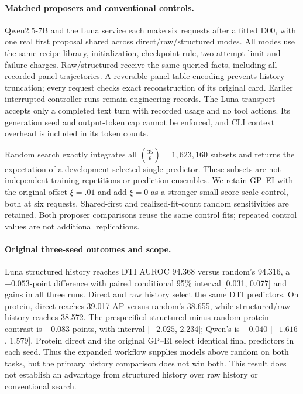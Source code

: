 \paragraph{Matched proposers and conventional controls.}
Qwen2.5-7B and the Luna service each make six requests after a fitted D00, with one real first proposal shared across direct/raw/structured modes. All modes use the same recipe library, initialization, checkpoint rule, two-attempt limit and failure charges. Raw/structured receive the same queried facts, including all recorded panel trajectories. A reversible panel-table encoding prevents history truncation; every request checks exact reconstruction of its original card. Earlier interrupted controller runs remain engineering records. The Luna transport accepts only a completed text turn with recorded usage and no tool actions. Its generation seed and output-token cap cannot be enforced, and CLI context overhead is included in its token counts.

Random search exactly integrates all $\binom{35}{6}=1{,}623{,}160$ subsets and returns the expectation of a development-selected single predictor. These subsets are not independent training repetitions or prediction ensembles. We retain GP--EI with the original offset $\xi=.01$ and add $\xi=0$ as a stronger small-score-scale control, both at six requests. Shared-first and realized-fit-count random sensitivities are retained. Both proposer comparisons reuse the same control fits; repeated control values are not additional replications.

\clearpage


\paragraph{Original three-seed outcomes and scope.}
Luna structured history reaches DTI AUROC 94.368 versus random's 94.316, a $+0.053$-point difference with paired conditional 95\% interval [0.031, 0.077] and gains in all three runs. Direct and raw history select the same DTI predictors. On protein, direct reaches 39.017 AP versus random's 38.655, while structured/raw history reaches 38.572. The prespecified structured-minus-random protein contrast is $-0.083$ points, with interval [$-2.025$, 2.234]; Qwen's is $-0.040$ [$-1.616$, 1.579]. Protein direct and the original GP--EI select identical final predictors in each seed. Thus the expanded workflow supplies models above random on both tasks, but the primary history comparison does not win both. This result does not establish an advantage from structured history over raw history or conventional search.

